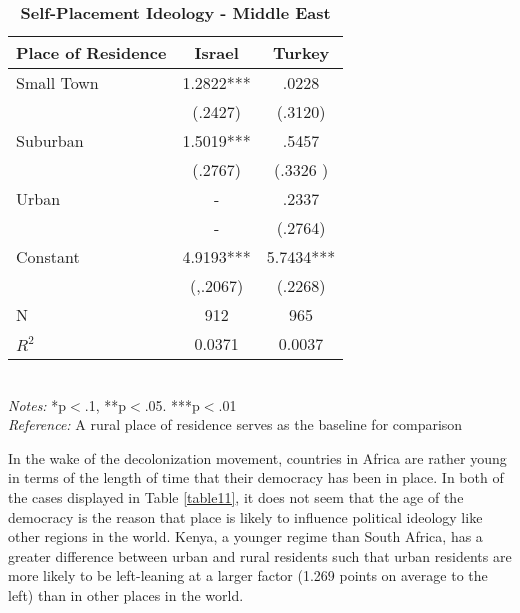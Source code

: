 \documentclass[12pt, titlepage]{article}
\newcommand\e{\emph}
\newcommand\tb{\textbf}
\begin{document}
\begin{singlespace}
	\begin{table}[H]
		\centering
		\caption{\tb{Self-Placement Ideology - Middle East}}
		\begin{tabulary}{\linewidth}{l c c}
			\\
			\hline
			\tb{Place of Residence}&\tb{Israel} & \tb{Turkey} \\
			\hline
			Small Town&1.2822*** & .0228 \\
			&(.2427)  & (.3120)\\
			Suburban&1.5019*** &.5457 \\
			& (.2767)  & (.3326 )\\
			Urban &- & .2337\\
			&- & (.2764)\\
			Constant& 4.9193*** &5.7434*** \\
			& (,.2067)  & (.2268)\\
			N&912 & 965\\
			$R^2$&0.0371 & 0.0037 \\
			\hline 
		\end{tabulary}
		\\
		\e{Notes:} *p$<$.1, **p$<$.05. ***p$<$.01 \\
		\e{Reference:} A rural place of residence serves as the baseline for comparison
		\label{table10}
	\end{table}
\end{singlespace}

In the wake of the decolonization movement, countries in Africa are rather young in terms of the length of time that their democracy has been in place. In both of the cases displayed in Table \ref{table11}, it does not seem that the age of the democracy is the reason that place is likely to influence political ideology like other regions in the world. Kenya, a younger regime than South Africa, has a greater difference between urban and rural residents such that urban residents are more likely to be left-leaning at a larger factor (1.269 points on average to the left) than in other places in the world. 
\end{document}
